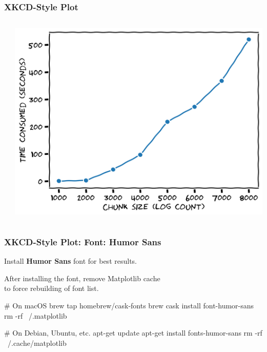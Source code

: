 \documentclass[xcolor={svgnames}]{beamer}
\newcommand{\pyfile}[2][]{}
\begin{document}
\begin{frame}[t,fragile]
    \frametitle{XKCD-Style Plot}
    \vspace{-2mm}
    \begin{columns}[T]
        \begin{column}{0.49\textwidth}
            \pyfile[style=footnotesize]{examples/xkcd-1.py}
        \end{column}
        \begin{column}{0.51\textwidth}
            \includegraphics[width=\textwidth]{img/xkcd-1.png}
        \end{column}
    \end{columns}
\end{frame}


\begin{frame}[t,fragile]
    \frametitle{XKCD-Style Plot: Font: Humor Sans}

    Install \textbf{Humor Sans} font for best results.

    \medskip

    After installing the font, remove Matplotlib cache \\
    to force rebuilding of font list.

    \medskip

    \begin{shenv}[gobble=8]
        # On macOS
        brew tap homebrew/cask-fonts
        brew cask install font-humor-sans
        rm -rf ~/.matplotlib

        # On Debian, Ubuntu, etc.
        apt-get update
        apt-get install fonts-humor-sans
        rm -rf ~/.cache/matplotlib
    \end{shenv}
\end{frame}
\end{document}
